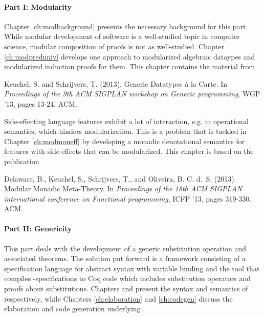 {\paragraph{Part I: Modularity}

Chapter \ref{ch:modbackground} presents the necessary background for this
part. While modular development of software is a well-studied topic in computer
science, modular composition of proofs is not as well-studied. Chapter
\ref{ch:modpreduniv} develops one approach to modularized algebraic dataypes and
modularized induction proofs for them. This chapter contains the material from

\begin{center}
  \begin{minipage}{0.85\columnwidth}
    Keuchel, S. and Schrijvers, T. (2013).
    \newblock Generic Datatypes \`a la Carte.
    \newblock In {\em Proceedings of the 9th ACM SIGPLAN workshop on Generic
      programming}, WGP ’13, pages 13-24. ACM.
  \end{minipage}
\end{center}

Side-effecting language features exhibit a lot of interaction, e.g. in
operational semantics, which hinders modularization. This is a problem that is
tackled in Chapter \ref{ch:modmoneff} by developing a monadic denotational
semantics for features with side-effects that can be modularized. This chapter
is based on the publication

\begin{center}
  \begin{minipage}{0.85\columnwidth}
    Delaware, B., Keuchel, S., Schrijvers, T., and Oliveira,
    B. C. d.~S. (2013).
    \newblock Modular Monadic Meta-Theory.
    \newblock In {\em Proceedings of the 18th ACM SIGPLAN international
      conference on Functional programming}, ICFP '13, pages 319-330. ACM.
  \end{minipage}
\end{center}


\paragraph{Part II: Genericity}
This part deals with the development of a generic substitution operation and
associated theorems. The solution put forward is a framework consisting of a
specification language \Knot for abstract syntax with variable binding and the
tool \Needle that compiles \Knot-specifications to Coq code which includes
substitution operators and proofs about
substitutions. Chapters \label{ch:knotsyntax} and \label{ch:knotsemantics}
present the syntax and semantics of \Knot respectively, while Chapters
\ref{ch:elaboration} and \ref{ch:codegen} discuss the elaboration and code
generation underlying \Needle.

}
